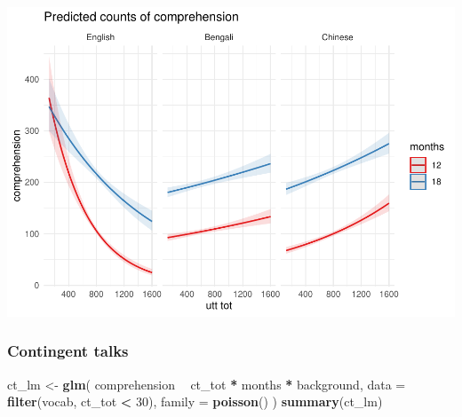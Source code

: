 \documentclass[]{article}
\newenvironment{Shaded}{\begin{snugshade}}{\end{snugshade}}
\newcommand{\DataTypeTok}[1]{\textcolor[rgb]{0.13,0.29,0.53}{#1}}
\newcommand{\DecValTok}[1]{\textcolor[rgb]{0.00,0.00,0.81}{#1}}
\newcommand{\KeywordTok}[1]{\textcolor[rgb]{0.13,0.29,0.53}{\textbf{#1}}}
\newcommand{\NormalTok}[1]{#1}
\newcommand{\OperatorTok}[1]{\textcolor[rgb]{0.81,0.36,0.00}{\textbf{#1}}}
\newcommand{\StringTok}[1]{\textcolor[rgb]{0.31,0.60,0.02}{#1}}
\begin{document}
\includegraphics{supplement_files/figure-latex/utt-lm-2-plot-1.pdf}

\hypertarget{contingent-talks}{%
\subsubsection{Contingent talks}\label{contingent-talks}}

\begin{Shaded}
\begin{Highlighting}[]
\NormalTok{ct_lm <-}\StringTok{ }\KeywordTok{glm}\NormalTok{(}
\NormalTok{  comprehension }\OperatorTok{~}
\StringTok{    }\NormalTok{ct_tot }\OperatorTok{*}
\StringTok{    }\NormalTok{months }\OperatorTok{*}
\StringTok{    }\NormalTok{background,}
  \DataTypeTok{data =} \KeywordTok{filter}\NormalTok{(vocab, ct_tot }\OperatorTok{<}\StringTok{ }\DecValTok{30}\NormalTok{),}
  \DataTypeTok{family =} \KeywordTok{poisson}\NormalTok{()}
\NormalTok{)}
\KeywordTok{summary}\NormalTok{(ct_lm)}
\end{Highlighting}
\end{Shaded}
\end{document}
